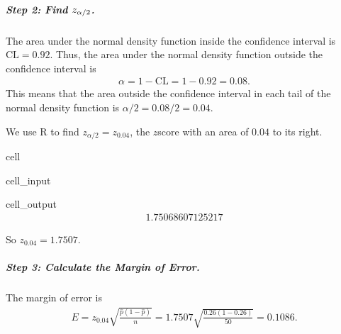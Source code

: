\documentclass[letterpaper,10pt,english]{jupyterBook}
\begin{document}
\subparagraph{Step 2: Find \protect\(z_{\alpha/2}\protect\).}
\label{\detokenize{Ch5 Confidence Intervals/5.2 Estimating Population Proportions:step-2-find-z-alpha-2}}
\sphinxAtStartPar
The area under the normal density function inside the confidence interval is \(\text{CL} = 0.92\). Thus, the area under the normal density function outside the confidence interval is
\begin{equation*}
\begin{split} \alpha = 1 - \text{CL} = 1 - 0.92 = 0.08. \end{split}
\end{equation*}
\sphinxAtStartPar
This means that the area outside the confidence interval in each tail of the normal density function is \(\alpha/2 = 0.08/2 = 0.04\).

\sphinxAtStartPar
We use R to find \(z_{\alpha/2} = z_{0.04}\), the \(z\)\sphinxhyphen{}score with an area of \(0.04\) to its right.

\begin{sphinxuseclass}{cell}\begin{sphinxVerbatimInput}

\begin{sphinxuseclass}{cell_input}
\begin{sphinxVerbatim}[commandchars=\\\{\}]
\end{sphinxVerbatim}

\end{sphinxuseclass}\end{sphinxVerbatimInput}
\begin{sphinxVerbatimOutput}

\begin{sphinxuseclass}{cell_output}\begin{equation*}
\begin{split}1.75068607125217\end{split}
\end{equation*}
\end{sphinxuseclass}\end{sphinxVerbatimOutput}

\end{sphinxuseclass}
\sphinxAtStartPar
So \(z_{0.04} = 1.7507\).


\subparagraph{Step 3: Calculate the Margin of Error.}
\label{\detokenize{Ch5 Confidence Intervals/5.2 Estimating Population Proportions:id2}}
\sphinxAtStartPar
The margin of error is
\begin{equation*}
\begin{split} E = z_{0.04}\sqrt{\frac{\hat{p}(1-\hat{p})}{n}} = 1.7507 \sqrt{\frac{0.26(1 - 0.26)}{50}} = 0.1086. \end{split}
\end{equation*}
\end{document}
